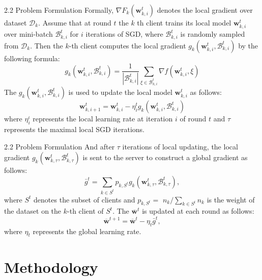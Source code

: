 \documentclass{sintefbeamer}
\theoremstyle{definition}
\begin{document}
\begin{frame}{2.2 Problem Formulation}
Formally, $\nabla F_k\left(\mathbf{w}_{k, i}^t\right)$ denotes the local gradient over dataset $\mathcal{D}_k$. Assume that at round $t$ the $k$ th client trains its local model $\mathbf{w}_{k, i}^t$ over mini-batch $\mathcal{B}_{k, i}^t$ for $i$ iterations of SGD, where $\mathcal{B}_{k, i}^t$ is randomly sampled from $\mathcal{D}_k$. Then the $k$-th client computes the local gradient $g_k\left(\mathbf{w}_{k, i}^t, \mathcal{B}_{k, i}^t\right)$ by the following formula:
$$
g_k\left(\mathbf{w}_{k, i}^t, \mathcal{B}_{k, i}^t\right)=\frac{1}{\left|\mathcal{B}_{k, i}^t\right|} \sum_{\xi \in \mathcal{B}_{k, i}^t} \nabla f\left(\mathbf{w}_{k, i}^t, \xi\right)
$$
The $g_k\left(\mathbf{w}_{k, i}^t, \mathcal{B}_{k, i}^t\right)$ is used to update the local model $\mathbf{w}_{k, i}^t$ as follows:
$$
\mathbf{w}_{k, i+1}^t=\mathbf{w}_{k, i}^t-\eta_i^t g_k\left(\mathbf{w}_{k, i}^t, \mathcal{B}_{k, i}^t\right)
$$
where $\eta_i^\iota$ represents the local learning rate at iteration $i$ of round $t$ and $\tau$ represents the maximal local SGD iterations. 

\end{frame}
\begin{frame}{2.2 Problem Formulation}
And after $\tau$ iterations of local updating, the local gradient $g_k\left(\mathbf{w}_{k, \tau}^t, \mathcal{B}_{k, \tau}^t\right)$ is sent to the server to construct a global gradient as follows:
$$
\bar{g}^t=\sum_{k \in S^t} p_{k, S^t} g_k\left(\mathbf{w}_{k, \tau}^t, \mathcal{B}_{k, \tau}^t\right),
$$
where $S^t$ denotes the subset of clients and $p_{k, S^t}=$ $n_k / \sum_{k \in S^t} n_k$ is the weight of the dataset on the $k$-th client of $S^t$. The $\overline{\mathbf{w}}^t$ is updated at each round as follows:
$$
\overline{\mathbf{w}}^{t+1}=\overline{\mathbf{w}}^t-\eta_t \bar{g}^t,
$$
where $\eta_t$ represents the global learning rate.
\end{frame}
\section{Methodology}
\end{document}
